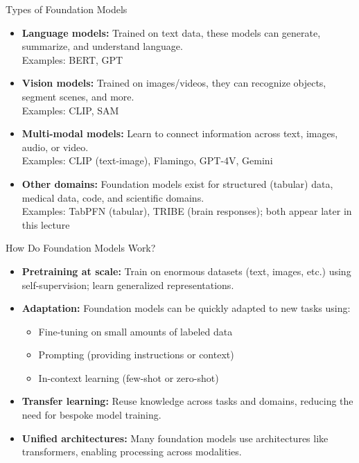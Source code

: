 \begin{frame}{Types of Foundation Models}
  \begin{itemize}
    \item \textbf{Language models:} Trained on text data, these models can generate, summarize, and understand language.\\
      {\footnotesize Examples: BERT, GPT}
    \item \textbf{Vision models:} Trained on images/videos, they can recognize objects, segment scenes, and more.\\
      {\footnotesize Examples: CLIP, SAM}
    \item \textbf{Multi-modal models:} Learn to connect information across text, images, audio, or video.\\
      {\footnotesize Examples: CLIP (text-image), Flamingo, GPT-4V, Gemini}
    \item \textbf{Other domains:} Foundation models exist for structured (tabular) data, medical data, code, and scientific domains.\\
      {\footnotesize Examples: TabPFN (tabular), TRIBE (brain responses); both appear later in this lecture}
  \end{itemize}
\end{frame}

\begin{frame}{How Do Foundation Models Work?}
  \begin{itemize}\footnotesize
    \item \textbf{Pretraining at scale:} Train on enormous datasets (text, images, etc.) using self-supervision; learn generalized representations.
    \item \textbf{Adaptation:} Foundation models can be quickly adapted to new tasks using:
      \begin{itemize}
        \item Fine-tuning on small amounts of labeled data
        \item Prompting (providing instructions or context)
        \item In-context learning (few-shot or zero-shot)
      \end{itemize}
    \item \textbf{Transfer learning:} Reuse knowledge across tasks and domains, reducing the need for bespoke model training.
    \item \textbf{Unified architectures:} Many foundation models use architectures like transformers, enabling processing across modalities.
  \end{itemize}
\end{frame}

